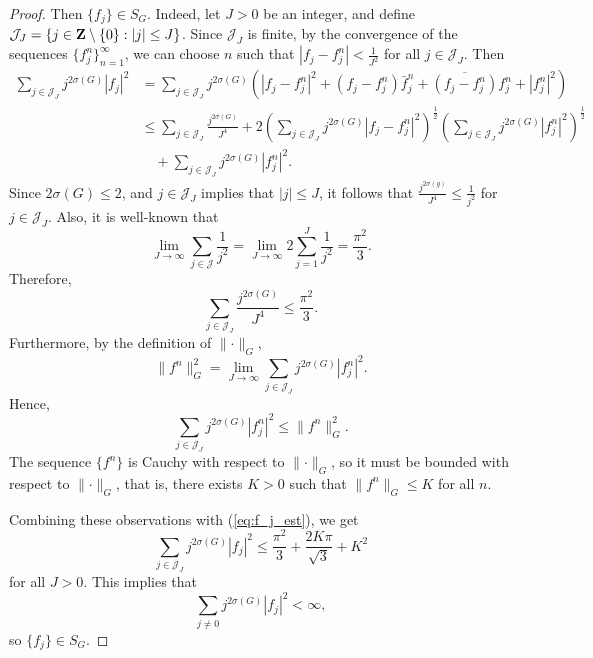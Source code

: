 \documentclass{homework}
\begin{document}
\begin{arabicparts}
\begin{proof}
			Then $\{f_j\} \in S_G$. Indeed, let $J > 0$ be an integer, and define $\mathcal{J}_J = \{j \in \textbf{Z} \setminus\{0\} : |j| \le J\}$. Since $\mathcal{J}_J$ is finite, by the convergence of the sequences $\{f^n_j\}_{n=1}^\infty$, we can choose $n$ such that $|f_j - f^n_j| < \frac{1}{J^2}$ for all $j \in \mathcal{J}_J$. Then
			\begin{equation}
			\label{eq:f_j_est}
			\begin{aligned}
				\sum_{j \in \mathcal{J}_J} j^{2\sigma(G)}|f_j|^2 &= \sum_{j\in\mathcal{J}_J} j^{2\sigma(G)}\left(|f_j - f^n_j|^2 + (f_j - f^n_j)\bar{f}^n_j + \overline{(f_j-f^n_j)}f^n_j + |f^n_j|^2\right) \\
				&\le \sum_{j\in\mathcal{J}_J}\frac{j^{2\sigma(G)}}{J^4} + 2\left(\sum_{j\in\mathcal{J}_J}j^{2\sigma(G)}|f_j-f^n_j|^2\right)^\frac{1}{2}\left(\sum_{j\in\mathcal{J}_J}j^{2\sigma(G)}|f^n_j|^2\right)^\frac{1}{2}\\
				&\quad + \sum_{j\in\mathcal{J}_J}j^{2\sigma(G)}|f^n_j|^2.
			\end{aligned}
			\end{equation}
			Since $2\sigma(G) \le 2$, and $j \in \mathcal{J}_J$ implies that $|j| \le J$, it follows that $\frac{j^{2\sigma(g)}}{J^4} \le \frac{1}{j^2}$ for $j \in \mathcal{J}_J$. Also, it is well-known that
			\begin{equation}
				\lim_{J\to\infty} \sum_{j\in\mathcal{J}}\frac{1}{j^2} = \lim_{J\to\infty}2\sum_{j=1}^J\frac{1}{j^2} = \frac{\pi^2}{3}.
			\end{equation}
			Therefore,
			\begin{equation}
				\sum_{j\in\mathcal{J}_J}\frac{j^{2\sigma(G)}}{J^4} \le \frac{\pi^2}{3}.
			\end{equation}
			Furthermore, by the definition of $\lVert\cdot\rVert_G$,
			\begin{equation}
				\lVert f^n\rVert_G^2 = \lim_{J\to\infty} \sum_{j\in\mathcal{J}_J}j^{2\sigma(G)}|f^n_j|^2.
			\end{equation}
			Hence,
			\begin{equation}
				\sum_{j\in\mathcal{J}_J}j^{2\sigma(G)}|f^n_j|^2 \le \lVert f^n\rVert_G^2.
			\end{equation}
			The sequence $\{f^n\}$ is Cauchy with respect to $\lVert\cdot\rVert_G$, so it must be bounded with respect to $\lVert \cdot\rVert_G$, that is, there exists $K > 0$ such that $\lVert f^n \rVert_G \le K$ for all $n$.
			
			Combining these observations with (\ref{eq:f_j_est}), we get
			\begin{equation}
				\sum_{j\in\mathcal{J}_J} j^{2\sigma(G)}|f_j|^2 \le \frac{\pi^2}{3} + \frac{2K\pi}{\sqrt{3}} + K^2
			\end{equation}
			for all $J > 0$. This implies that
			\begin{equation}
				\sum_{j\ne 0} j^{2\sigma(G)}|f_j|^2 < \infty,
			\end{equation}
			so $\{f_j\} \in S_G$.
			

\end{proof}
\end{arabicparts}
\end{document}
